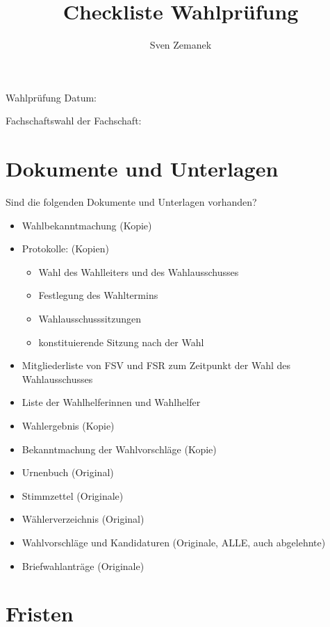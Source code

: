 \documentclass[a4paper]{scrartcl}
\title{Checkliste Wahlprüfung}
\author{Sven Zemanek}
\begin{document}
{\Huge Wahlprüfung} \hspace{5cm} Datum: \hrulefill

{\huge Fachschaftswahl der Fachschaft:} 

\vspace{0.8cm}
\hrulefill



\section{Dokumente und Unterlagen}

Sind die folgenden Dokumente und Unterlagen vorhanden?

\begin{itemize}[label=$\Box$]
\item Wahlbekanntmachung (Kopie)
\item Protokolle: (Kopien)
\begin{itemize}[label=$\Box$]
\item Wahl des Wahlleiters und des  Wahlausschusses
\item Festlegung des Wahltermins
\item Wahlausschusssitzungen
\item konstituierende Sitzung nach der Wahl
\end{itemize}

\item Mitgliederliste von FSV und FSR zum Zeitpunkt der Wahl des Wahlausschusses

\item Liste der Wahlhelferinnen und Wahlhelfer

\item Wahlergebnis (Kopie)

\item Bekanntmachung der Wahlvorschläge (Kopie)

\item Urnenbuch (Original)

\item Stimmzettel (Originale)

\item Wählerverzeichnis (Original)

\item Wahlvorschläge und Kandidaturen (Originale, ALLE, auch abgelehnte)

\item Briefwahlanträge (Originale)
\end{itemize}

\section{Fristen}
\end{document}
